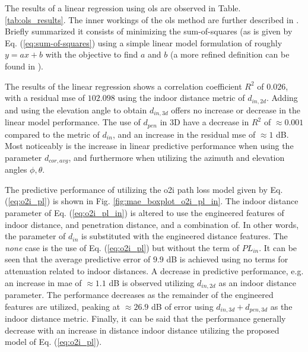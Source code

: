 The results of a linear regression using \gls{ols} are observed in Table. \ref{tab:ols_results}. The inner workings of the \gls{ols} method are further described in \cite{seabold2010statsmodels}. Briefly summarized it consists of minimizing the sum-of-squares (as is given by Eq. (\ref{eq:sum-of-squares}) using a simple linear model formulation of roughly $y=ax+b$ with the objective to find $a$ and $b$ (a more refined definition can be found in \cite{M.Bishop2006}). 

The results of the linear regression shows a correlation coefficient $R^2$ of $0.026$, with a residual \gls{mse} of $102.098$ using the indoor distance metric of $d_{in,2d}$. Adding and using the elevation angle to obtain $d_{in,3d}$ offers no increase or decrease in the linear model performance. The use of $d_{pen}$ in $3$D have a decrease in  $R^2$ of $\approx 0.001$ compared to the metric of $d_{in}$, and an increase in the residual \gls{mse} of $\approx 1$ dB. Most noticeably is the increase in linear predictive performance when using the parameter $d_{cor,avg}$, and furthermore when utilizing the azimuth and elevation angles $\phi, \theta$.


The predictive performance of utilizing the \gls{o2i} path loss model given by Eq. (\ref{eq:o2i_pl}) is shown in Fig. \ref{fig:mae_boxplot_o2i_pl_in}. The indoor distance parameter of Eq. (\ref{eq:o2i_pl_in}) is altered to use the engineered features of indoor distance, and penetration distance, and a combination of. In other words, the parameter of $d_{in}$ is substituted with the engineered distance features. The \emph{none} case is the use of Eq. (\ref{eq:o2i_pl}) but without the term of $PL_{in}$. It can be seen that the average predictive error of $9.9$ dB is achieved using no terms for attenuation related to indoor distances. A decrease in predictive performance, e.g. an increase in \gls{mae} of $\approx 1.1$ dB is observed utilizing $d_{in,2d}$ as an indoor distance parameter. The performance decreases as the remainder of the engineered features are utilized, peaking at $\approx 26.9$ dB of error using $d_{in,3d}+d_{pen,3d}$ as the indoor distance metric. Finally, it can be said that the performance generally decrease with an increase in distance indoor distance utilizing the proposed model of Eq. (\ref{eq:o2i_pl}).


